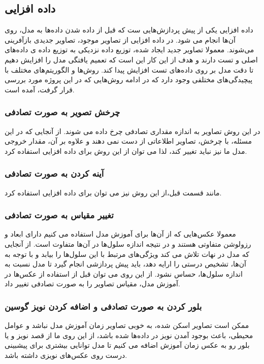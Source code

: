 \subsection{داده افزایی}\label{subsec:داده-افزایی}

داده افزایی یکی از پیش پردازش‌هایی ست که قبل از داده شدن داده‌ها به مدل، روی آن‌ها انجام می شود.
در داده افزایی از تصاویر موجود، تصاویر جدیدی بازآفرینی می‌شوند.
معمولا تصاویر جدید ایجاد شده، توزیع داده نزدیکی به توزیع داده ی داده‌های اصلی و تست دارند و هدف از این کار این است که تعمیم یافتگی مدل را افزایش دهیم تا دقت مدل بر روی داده‌های تست افزایش پیدا کند.
روش‌ها و الگوریتم‌های مختلف با پیچیدگی‌های مختلفی وجود دارد که در ادامه روش‌هایی که در این پروژه مورد بررسی قرار گرفت، آمده است.
\subsubsection{چرخش تصویر به صورت تصادفی}
در این روش تصاویر به اندازه مقداری تصادفی چرخ داده می شوند.
از آنجایی که در این مسئله، با چرخش، تصاویر اطلاعاتی از دست نمی دهند و علاوه بر آن، مقدار خروجی مدل ما نیز نباید تغییر کند، لذا می توان از این روش برای داده افزایی استفاده کرد.

\subsubsection{آینه کردن به صورت تصادفی}
مانند قسمت قبل،از این روش نیز می توان برای داده افزایی استفاده کرد.

\subsubsection{تغییر مقیاس به صورت تصادفی}
معمولا عکس‌هایی که از آن‌ها برای آموزش مدل استفاده می کنیم دارای ابعاد و رزولوشن متفاوتی هستند و در نتیجه اندازه سلول‌ها در آن‌ها متفاوت است.
از آنجایی که مدل در نهات تلاش می کند ویژگی‌های مرتبط با این سلول‌ها را بیابد و با توجه به آن‌ها، تشخیص درستی را ارایه دهد، باید پیش پردازشی انجام گیرد تا مدل نسبت به اندازه سلول‌ها، حساس نشود. از این روی می توان قبل از استفاده از عکس‌ها در آموزش مدل، مقیاس تصاویر را به صورت تصادفی تغییر داد.

\subsubsection{بلور کردن به صورت تصادفی و اضافه کردن نویز گوسین }
ممکن است تصاویر اسکن شده، به خوبی تصاویر زمان آموزش مدل نباشد و عوامل محیطی، باعث بوجود آمدن نویز در داده‌ها شده باشد، از این روی ما از قصد نویز و یا بلور رو به عکس زمان آموزش اضافه می کنیم تا مدل توانایی بیشتری برای پیشبینی درست روی عکس‌های نویزی داشته باشد.

